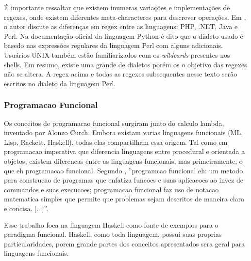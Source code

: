 É importante ressaltar que existem inumeras variações e implementações de regexes, onde existem diferentes meta-characteres para descrever operações.
Em \cite{mastering}, o autor discute as diferenças em regex entre as linguagens: PHP, .NET, Java e Perl.
Na documentação oficial da linguagem Python \cite{python-re} é dito que o dialeto usado é basedo nas expressões regulares da linguagem Perl com alguns adicionais.
Usuários UNIX também estão familiarizados com os \emph{wildcards} presentes nos shells.
Em resumo, existe uma grande de dialetos porém os o objetivo das regexes não se altera.
A regex acima e todas as regexes subsequentes nesse texto serão escritos no dialeto da linguagem Perl. 


\subsubsection{Programacao Funcional}

Os conceitos de programacao funcional surgiram junto do calculo lambda, inventado por Alonzo Curch.
Embora existam varias linguagens funcionais (ML, Lisp, Rackett, Haskell), todas elas compartilham essa origem.
Tal como em programacao imperativa que diferencia linguagens entre procedural e orientada a objetos, existem diferencas entre as linguagens funcionais, mas primeiramente, o que eh programacao funcional.
Segundo \cite{Bird}, ''programcao funcional eh: um metodo para construcao de programas que enfatiza funcoes e suas aplicacoes ao invez de commandos e suas execucoes; programacao funcional faz uso de notacao matematica simples que permite que problemas sejam descritos de maneira clara e concisa. [...]''.

Esse trabalho foca na linguagem Haskell como fonte de exemplos para o paradigma funcional.
Haskell, como toda linguagem, possui suas proprias particularidades, porem grande partes dos conceitos apresentados sera geral para linguagens funcionais.

